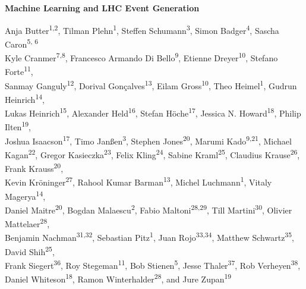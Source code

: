 \documentclass[submission,Phys]{SciPost}
\begin{document}
\begin{center}{\Large \textbf{
Machine Learning and LHC Event Generation
}}\end{center}

\begin{center}
Anja Butter\textsuperscript{1,2},
Tilman Plehn\textsuperscript{1},
Steffen Schumann\textsuperscript{3}, 
Simon Badger\textsuperscript{4},
Sascha Caron\textsuperscript{5, 6} \\
Kyle Cranmer\textsuperscript{7,8},
Francesco Armando Di Bello\textsuperscript{9},
Etienne Dreyer\textsuperscript{10},
Stefano Forte\textsuperscript{11}, \\
Sanmay Ganguly\textsuperscript{12},
Dorival Gon\c{c}alves\textsuperscript{13},
Eilam Gross\textsuperscript{10},
Theo Heimel\textsuperscript{1},
Gudrun Heinrich\textsuperscript{14}, \\
Lukas Heinrich\textsuperscript{15},
Alexander Held\textsuperscript{16},
Stefan H\"oche\textsuperscript{17}, 
Jessica N. Howard\textsuperscript{18},
Philip Ilten\textsuperscript{19}, \\
Joshua Isaacson\textsuperscript{17},
Timo Jan{\ss}en\textsuperscript{3},
Stephen Jones\textsuperscript{20},
Marumi Kado\textsuperscript{9,21},
Michael Kagan\textsuperscript{22},
Gregor Kasieczka\textsuperscript{23},
Felix Kling\textsuperscript{24},
Sabine Kraml\textsuperscript{25},
Claudius Krause\textsuperscript{26},
Frank Krauss\textsuperscript{20}, \\
Kevin Kr{\"o}ninger\textsuperscript{27},
Rahool Kumar Barman\textsuperscript{13}, 
Michel Luchmann\textsuperscript{1}, 
Vitaly Magerya\textsuperscript{14}, \\
Daniel Maitre\textsuperscript{20},
Bogdan Malaescu\textsuperscript{2}, 
Fabio Maltoni\textsuperscript{28,29},
Till Martini\textsuperscript{30},
Olivier Mattelaer\textsuperscript{28}, \\
Benjamin Nachman\textsuperscript{31,32},
Sebastian Pitz\textsuperscript{1},
Juan Rojo\textsuperscript{33,34},
Matthew Schwartz\textsuperscript{35},
David Shih\textsuperscript{25}, \\
Frank Siegert\textsuperscript{36}, 
Roy Stegeman\textsuperscript{11},
Bob Stienen\textsuperscript{5},
Jesse Thaler\textsuperscript{37},
Rob Verheyen\textsuperscript{38}, \\
Daniel Whiteson\textsuperscript{18}, 
Ramon Winterhalder\textsuperscript{28}, and
Jure Zupan\textsuperscript{19}
\end{center}
\end{document}
